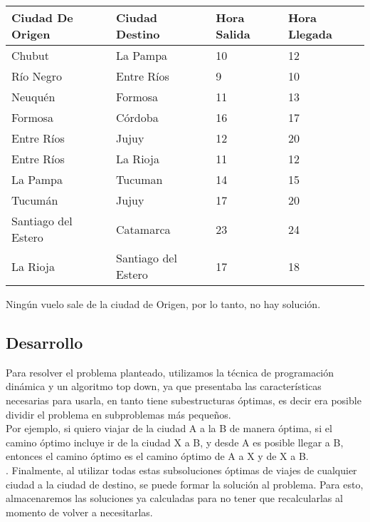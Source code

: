 \begin{enumerate}
\begin{center}
	\begin{tabular}{| l | l | l | l |}
	\hline
	Ciudad De Origen & Ciudad Destino & Hora Salida & Hora Llegada\\ \hline
	Chubut & La Pampa & 10 &	12\\
	Río Negro & Entre Ríos & 9 & 10 \\
	Neuquén & Formosa	&	11	& 13\\
	Formosa	& Córdoba	& 16 & 17  \\
	Entre Ríos & Jujuy	& 12 & 20\\
	Entre Ríos & La Rioja	&	11 & 12\\
	La Pampa & Tucuman	&	14 & 15\\
	Tucumán & Jujuy &	17 & 20\\
	Santiago del Estero	& Catamarca & 23 & 24\\
	La Rioja & Santiago del Estero & 17&18\\
	\hline
	\end{tabular}
\end{center}

Ningún vuelo sale de la ciudad de Origen, por lo tanto, no hay solución.





\end{enumerate}

\newpage
\subsection{Desarrollo}


Para resolver el problema planteado, utilizamos la técnica de programación dinámica y un algoritmo top down, ya que presentaba las características necesarias para usarla, en tanto tiene subestructuras óptimas, es decir era posible dividir el problema en subproblemas más pequeños.\\

Por ejemplo, si quiero viajar de la ciudad A a la B de manera óptima, si el camino óptimo incluye ir de la ciudad X a B, y desde A es posible llegar a B, entonces el camino óptimo es el camino óptimo de A a X y de X a B.\\
.
Finalmente, al utilizar todas estas subsoluciones óptimas de viajes de cualquier ciudad a la ciudad de destino, se puede formar la solución al problema. Para esto, almacenaremos las soluciones ya calculadas para no tener que recalcularlas al momento de volver a necesitarlas.\\

